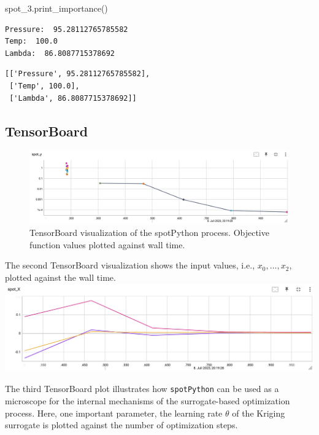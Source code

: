 \documentclass[
  letterpaper,
  DIV=11,
  numbers=noendperiod]{scrreprt}
\newenvironment{Shaded}{\begin{snugshade}}{\end{snugshade}}
\newcommand{\NormalTok}[1]{\textcolor[rgb]{0.00,0.23,0.31}{#1}}
\begin{document}
\begin{Shaded}
\begin{Highlighting}[]
\NormalTok{spot\_3.print\_importance()}
\end{Highlighting}
\end{Shaded}

\begin{verbatim}
Pressure:  95.28112765785582
Temp:  100.0
Lambda:  86.8087715378692
\end{verbatim}

\begin{verbatim}
[['Pressure', 95.28112765785582],
 ['Temp', 100.0],
 ['Lambda', 86.8087715378692]]
\end{verbatim}

\hypertarget{tensorboard-3}{%
\subsection{TensorBoard}\label{tensorboard-3}}

\begin{figure}

{\centering \includegraphics{figures_static/02_tensorboard_01.png}

}

\caption{TensorBoard visualization of the spotPython process. Objective
function values plotted against wall time.}

\end{figure}

The second TensorBoard visualization shows the input values, i.e.,
\(x_0, \ldots, x_2\), plotted against the wall time.
\includegraphics{figures_static/02_tensorboard_02.png}

The third TensorBoard plot illustrates how \texttt{spotPython} can be
used as a microscope for the internal mechanisms of the surrogate-based
optimization process. Here, one important parameter, the learning rate
\(\theta\) of the Kriging surrogate is plotted against the number of
optimization steps.
\end{document}
